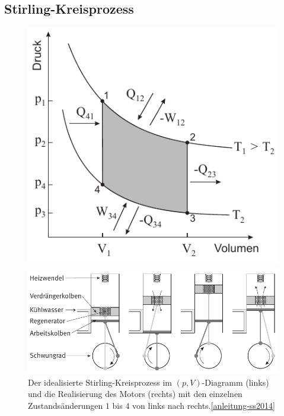 \subsection{Stirling-Kreisprozess}
\begin{figure}
	\centering
	\begin{minipage}{0.37\linewidth}
		\includegraphics[width=\linewidth]{res/Stirling-Kreisprozess.pdf}
	\end{minipage}
	\begin{minipage}{0.62\linewidth}
		\includegraphics[width=\linewidth]{res/Takte_Stirlingmotor.pdf}
	\end{minipage}	
	\caption{Der idealisierte Stirling-Kreisprozess im $(p, V)$-Diagramm (links) und die Realisierung des Motors (rechts) mit den einzelnen Zustandsänderungen $1$ bis $4$ von links nach rechts.\cref{anleitung-ss2014} \label{fig:stirling-kreisprozess}}
\end{figure}

